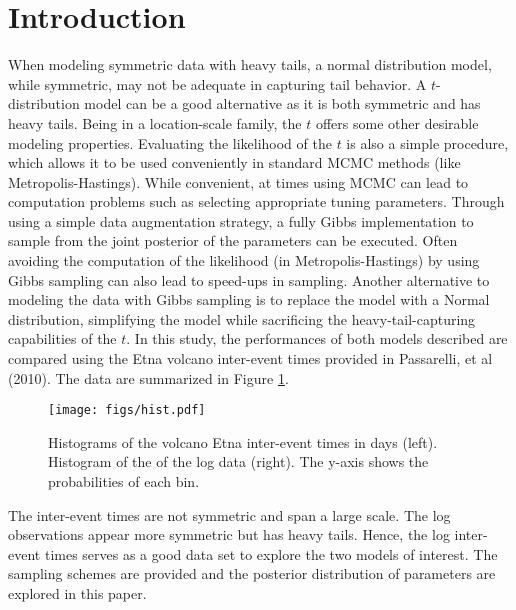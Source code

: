 \documentclass{../../tex_template/asaproc}
\begin{document}
\section{Introduction}
When modeling symmetric data with heavy tails, a normal distribution model,
while symmetric, may not be adequate in capturing tail behavior. A
$t$-distribution model can be a good alternative as it is both symmetric and
has heavy tails. Being in a location-scale family, the $t$ offers some other
desirable modeling properties. Evaluating the likelihood of the $t$ is also a
simple procedure, which allows it to be used conveniently in standard MCMC
methods (like Metropolis-Hastings). While convenient, at times using MCMC can
lead to computation problems such as selecting appropriate tuning parameters.
Through using a simple data augmentation strategy, a fully Gibbs implementation
to sample from the joint posterior of the parameters can be executed. Often
avoiding the computation of the likelihood (in Metropolis-Hastings) by using
Gibbs sampling can also lead to speed-ups in sampling. Another alternative to
modeling the data with Gibbs sampling is to replace the model with a Normal
distribution, simplifying the model while sacrificing the heavy-tail-capturing
capabilities of the $t$. In this study, the performances of both models
described are compared using the Etna volcano inter-event times provided in
Passarelli, et al (2010). The data are summarized in Figure \ref{fig:hist}.
\begin{figure}[H]
  \texttt{[image: figs/hist.pdf]}
  \caption{\small Histograms of the volcano Etna inter-event times in days (left). Histogram of the 
  of the log data (right). The y-axis shows the probabilities of each bin.}
  \label{fig:hist}
\end{figure}
The inter-event times are not symmetric and span a large scale. The log observations
appear more symmetric but has heavy tails. Hence, the log inter-event times serves
as a good data set to explore the two models of interest. The sampling schemes
are provided and the posterior distribution of parameters are explored in this
paper.
\end{document}
